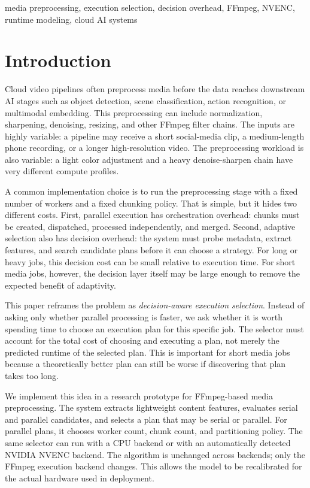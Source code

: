 \documentclass[conference]{IEEEtran}
\begin{document}
\begin{IEEEkeywords}
media preprocessing, execution selection, decision overhead, FFmpeg, NVENC, runtime modeling, cloud AI systems
\end{IEEEkeywords}

\section{Introduction}

Cloud video pipelines often preprocess media before the data reaches downstream AI stages such as object detection, scene classification, action recognition, or multimodal embedding.
This preprocessing can include normalization, sharpening, denoising, resizing, and other FFmpeg filter chains.
The inputs are highly variable: a pipeline may receive a short social-media clip, a medium-length phone recording, or a longer high-resolution video.
The preprocessing workload is also variable: a light color adjustment and a heavy denoise-sharpen chain have very different compute profiles.

A common implementation choice is to run the preprocessing stage with a fixed number of workers and a fixed chunking policy.
That is simple, but it hides two different costs.
First, parallel execution has orchestration overhead: chunks must be created, dispatched, processed independently, and merged.
Second, adaptive selection also has decision overhead: the system must probe metadata, extract features, and search candidate plans before it can choose a strategy.
For long or heavy jobs, this decision cost can be small relative to execution time.
For short media jobs, however, the decision layer itself may be large enough to remove the expected benefit of adaptivity.

This paper reframes the problem as \emph{decision-aware execution selection}.
Instead of asking only whether parallel processing is faster, we ask whether it is worth spending time to choose an execution plan for this specific job.
The selector must account for the total cost of choosing and executing a plan, not merely the predicted runtime of the selected plan.
This is important for short media jobs because a theoretically better plan can still be worse if discovering that plan takes too long.

We implement this idea in a research prototype for FFmpeg-based media preprocessing.
The system extracts lightweight content features, evaluates serial and parallel candidates, and selects a plan that may be serial or parallel.
For parallel plans, it chooses worker count, chunk count, and partitioning policy.
The same selector can run with a CPU backend or with an automatically detected NVIDIA NVENC backend.
The algorithm is unchanged across backends; only the FFmpeg execution backend changes.
This allows the model to be recalibrated for the actual hardware used in deployment.
\end{document}
